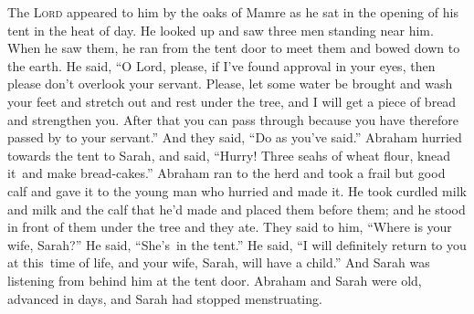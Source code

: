 
\begin{inparaenum}
     The \textsc{Lord} appeared to him by the oaks of Mamre as he sat in the opening of his tent in the heat of day.%
     He looked up and saw three men standing near him. When he saw them, he ran from the tent door to meet them and bowed down to the earth.%
     He said, ``O Lord, please, if I've found approval in your eyes, then please don't overlook your servant.%
     Please, let some water be brought and wash your feet and stretch out and rest under the tree,%
     and I will get a piece of bread and strengthen you. After that you can pass through because you have therefore passed by to your servant.'' And they said, ``Do as you've said.''%
     Abraham hurried towards the tent to Sarah, and said, ``Hurry! Three seahs of wheat flour, knead it\understood\ and make bread-cakes.''%
     Abraham ran to the herd and took a frail but good calf and gave it to the young man who hurried and made it.%
     He took curdled milk and milk and the calf that he'd made and placed them before them; and he stood in front of them under the tree and they ate.%
     They said to him, ``Where is your wife, Sarah?'' He said, ``She's\understood\ in the tent.''%
     He said, ``I will definitely return to you at this\understood\ time of life, and your wife, Sarah, will have a child.'' And Sarah was listening from behind him at the tent door.%
     Abraham and Sarah were old, advanced in days, and Sarah had stopped menstruating.%

\end{inparaenum}
